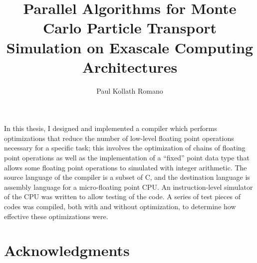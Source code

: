 \documentclass[12pt,twoside]{mitthesis}
\begin{document}

\title{Parallel Algorithms for Monte Carlo Particle Transport Simulation on
  Exascale Computing Architectures}

\author{Paul Kollath Romano}



\maketitle


\cleardoublepage
\setcounter{savepage}{\thepage}

\begin{abstractpage}
In this thesis, I designed and implemented a compiler which performs
optimizations that reduce the number of low-level floating point operations
necessary for a specific task; this involves the optimization of chains of
floating point operations as well as the implementation of a ``fixed'' point
data type that allows some floating point operations to simulated with integer
arithmetic.  The source language of the compiler is a subset of C, and the
destination language is assembly language for a micro-floating point CPU.  An
instruction-level simulator of the CPU was written to allow testing of the code.
A series of test pieces of codes was compiled, both with and without
optimization, to determine how effective these optimizations were.
\end{abstractpage}

\cleardoublepage


\section*{Acknowledgments}
\end{document}
